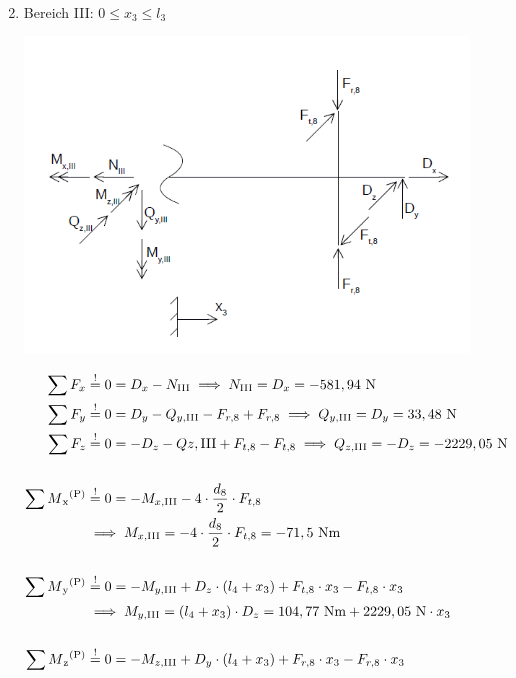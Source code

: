 \begin{enumerate}
\begin{align*}
\end{align*}
\newpage
\item Bereich III: $0 \leq x_3 \leq l_3$
\begin{center}
	\includegraphics[width=0.93\textwidth,keepaspectratio]{figures/Bereich3.png}
\end{center}
	\begin{align*}
        \sum F_x &\overset{!}{=} 0 = D_x - N_{\mathrm{III}} 
				\implies  N_{\mathrm{III}} = D_x = -581,94 \text { N}\\ 
        \sum F_y &\overset{!}{=} 0 =D_y - Q_{y,\mathrm{III}} -F_{r,8} +F_{r,8}
				\implies Q_{y,\mathrm{III}} = D_y = 33,48 \text{ N}\\ 
		\sum F_z &\overset{!}{=} 0 = -D_z -Q{z,\mathrm{III}} +F_{t,8} - F_{t,8}
				\implies Q_{z,\mathrm{III}} = -D_z = -2229,05 \text{ N} \\ \\
        \sum M\textsubscript{x}\textsuperscript{(P)} &\overset{!}{=} 0 =- M_{x,\mathrm{III}} - 4 \x \frac{d_8}{2}\x F_{t,8} \\
				&\implies M_{x,\mathrm{III}} = - 4 \x \frac{d_8}{2}\x F_{t,8} = -71,5 \text{ Nm} \\ \\
		\sum M\textsubscript{y}\textsuperscript{(P)} &\overset{!}{=} 0 =- M_{y,\mathrm{III}} + D_z \x (l_4+ x_3) + F_{t,8} \x x_3 - F_{t,8} \x x_3\\
				&\implies M_{y,\mathrm{III}} = (l_4 + x_3) \x D_z =104,77 \text{ Nm} +2229,05 \text{ N} \x x_3\\ \\
		\sum M\textsubscript{z}\textsuperscript{(P)} &\overset{!}{=} 0 = - M_{z,\mathrm{III}} + D_y \x (l_4 + x_3) + F_{r,8} \x x_3 - F_{r,8} \x x_3 \\

\end{align*}
\end{enumerate}
